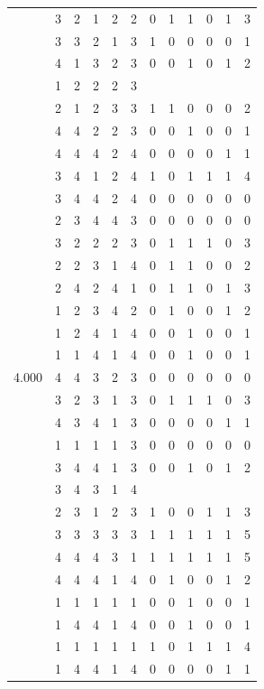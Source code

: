 \documentclass[]{book}
\theoremstyle{definition}
\theoremstyle{definition}
\theoremstyle{definition}
\theoremstyle{remark}
\begin{document}
\begin{table}
{\begin{tabular}[t]{rrrrrrrrrrrr}
 & 3 & 2 & 1 & 2 & 2 & 0 & 1 & 1 & 0 & 1 & 3\\
 & 3 & 3 & 2 & 1 & 3 & 1 & 0 & 0 & 0 & 0 & 1\\
 & 4 & 1 & 3 & 2 & 3 & 0 & 0 & 1 & 0 & 1 & 2\\
 & 1 & 2 & 2 & 2 & 3 &  &  &  &  &  & \\
 & 2 & 1 & 2 & 3 & 3 & 1 & 1 & 0 & 0 & 0 & 2\\
 & 4 & 4 & 2 & 2 & 3 & 0 & 0 & 1 & 0 & 0 & 1\\
 & 4 & 4 & 4 & 2 & 4 & 0 & 0 & 0 & 0 & 1 & 1\\
 & 3 & 4 & 1 & 2 & 4 & 1 & 0 & 1 & 1 & 1 & 4\\
 & 3 & 4 & 4 & 2 & 4 & 0 & 0 & 0 & 0 & 0 & 0\\
 & 2 & 3 & 4 & 4 & 3 & 0 & 0 & 0 & 0 & 0 & 0\\
 & 3 & 2 & 2 & 2 & 3 & 0 & 1 & 1 & 1 & 0 & 3\\
 & 2 & 2 & 3 & 1 & 4 & 0 & 1 & 1 & 0 & 0 & 2\\
 & 2 & 4 & 2 & 4 & 1 & 0 & 1 & 1 & 0 & 1 & 3\\
 & 1 & 2 & 3 & 4 & 2 & 0 & 1 & 0 & 0 & 1 & 2\\
 & 1 & 2 & 4 & 1 & 4 & 0 & 0 & 1 & 0 & 0 & 1\\
 & 1 & 1 & 4 & 1 & 4 & 0 & 0 & 1 & 0 & 0 & 1\\
4.000 & 4 & 4 & 3 & 2 & 3 & 0 & 0 & 0 & 0 & 0 & 0\\
 & 3 & 2 & 3 & 1 & 3 & 0 & 1 & 1 & 1 & 0 & 3\\
 & 4 & 3 & 4 & 1 & 3 & 0 & 0 & 0 & 0 & 1 & 1\\
 & 1 & 1 & 1 & 1 & 3 & 0 & 0 & 0 & 0 & 0 & 0\\
 & 3 & 4 & 4 & 1 & 3 & 0 & 0 & 1 & 0 & 1 & 2\\
 & 3 & 4 & 3 & 1 & 4 &  &  &  &  &  & \\
 & 2 & 3 & 1 & 2 & 3 & 1 & 0 & 0 & 1 & 1 & 3\\
 & 3 & 3 & 3 & 3 & 3 & 1 & 1 & 1 & 1 & 1 & 5\\
 & 4 & 4 & 4 & 3 & 1 & 1 & 1 & 1 & 1 & 1 & 5\\
 & 4 & 4 & 4 & 1 & 4 & 0 & 1 & 0 & 0 & 1 & 2\\
 & 1 & 1 & 1 & 1 & 1 & 0 & 0 & 1 & 0 & 0 & 1\\
 & 1 & 4 & 4 & 1 & 4 & 0 & 0 & 1 & 0 & 0 & 1\\
 & 1 & 1 & 1 & 1 & 1 & 1 & 0 & 1 & 1 & 1 & 4\\
 & 1 & 4 & 4 & 1 & 4 & 0 & 0 & 0 & 0 & 1 & 1\\

\end{tabular}}
\end{table}
\end{document}
